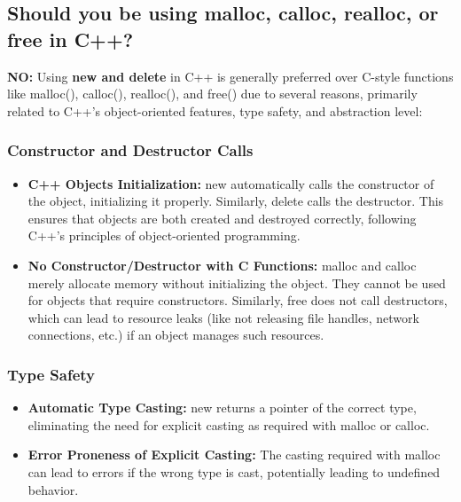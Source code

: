 \documentclass{report}
\begin{document}
    \bigbreak \noindent 
    \subsection{Should you be using malloc, calloc, realloc, or free in C++?}
    \bigbreak \noindent 
    \begin{concept}
        \textbf{NO:} Using \textbf{new and delete} in C++ is generally preferred over C-style functions like malloc(), calloc(), realloc(), and free() due to several reasons, primarily related to C++'s object-oriented features, type safety, and abstraction level:
    \end{concept}
    \bigbreak \noindent 
    \subsubsection{Constructor and Destructor Calls}
    \begin{itemize}
        \item \textbf{C++ Objects Initialization:} new automatically calls the constructor of the object, initializing it properly. Similarly, delete calls the destructor. This ensures that objects are both created and destroyed correctly, following C++'s principles of object-oriented programming.
        \item \textbf{No Constructor/Destructor with C Functions:} malloc and calloc merely allocate memory without initializing the object. They cannot be used for objects that require constructors. Similarly, free does not call destructors, which can lead to resource leaks (like not releasing file handles, network connections, etc.) if an object manages such resources.
    \end{itemize}

    \bigbreak \noindent 
    \subsubsection{Type Safety}
    \begin{itemize}
        \item \textbf{Automatic Type Casting:} new returns a pointer of the correct type, eliminating the need for explicit casting as required with malloc or calloc.
        \item \textbf{Error Proneness of Explicit Casting:} The casting required with malloc can lead to errors if the wrong type is cast, potentially leading to undefined behavior.
    \end{itemize}
\end{document}
